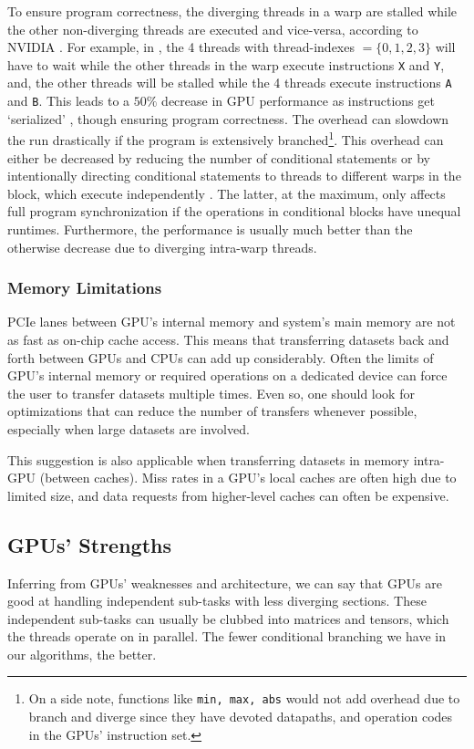 To ensure program correctness, the diverging threads in a warp are stalled while the other non-diverging threads are executed and vice-versa, according to NVIDIA \cite{CUDADocs,ParallelNVIDIA}. For example, in , the 4 threads with thread-indexes $=\{0,1,2,3\}$ will have to wait while the other threads in the warp execute instructions \texttt{X} and \texttt{Y}, and, the other threads will be stalled while the 4 threads execute instructions \texttt{A} and \texttt{B}. This leads to a $50\%$ decrease in GPU performance as instructions get `serialized' \cite{ParallelNVIDIA}, though ensuring program correctness. The overhead can slowdown the run drastically if the program is extensively branched\footnote{On a side note, functions like \texttt{min, max, abs} would not add overhead due to branch and diverge since they have devoted datapaths, and operation codes in the GPUs' instruction set.}. This overhead can either be decreased by reducing the number of conditional statements or by intentionally directing conditional statements to threads to different warps in the block, which execute independently \cite{ParallelNVIDIA}. The latter, at the maximum, only affects full program synchronization if the operations in conditional blocks have unequal runtimes. Furthermore, the performance is usually much better than the otherwise decrease due to diverging intra-warp threads.

\subsubsection{Memory Limitations}
PCIe lanes between GPU's internal memory and system's main memory are not as fast as on-chip cache access\cite{CUDADocs, ParallelNVIDIA}. This means that transferring datasets back and forth between GPUs and CPUs can add up considerably. Often the limits of GPU's internal memory or required operations on a dedicated device can force the user to transfer datasets multiple times. Even so, one should look for optimizations that can reduce the number of transfers whenever possible, especially when large datasets are involved.

This suggestion is also applicable when transferring datasets in memory intra-GPU (between caches). Miss rates in a GPU's local caches are often high due to limited size, and data requests from higher-level caches can often be expensive.

\subsection{GPUs' Strengths} \label{sec:Gpu's Strengths}
Inferring from GPUs' weaknesses and architecture, we can say that GPUs are good at handling independent sub-tasks with less diverging sections. These independent sub-tasks can usually be clubbed into matrices and tensors, which the threads operate on in parallel. The fewer conditional branching we have in our algorithms, the better.

